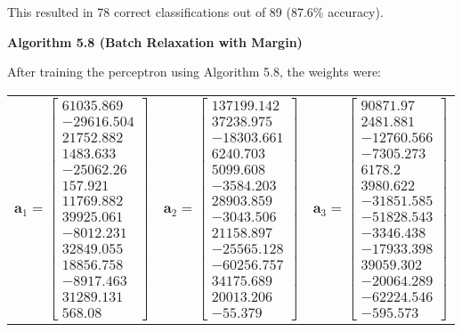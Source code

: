\documentclass{article}
\newcommand{\mbf}[1]{\ensuremath{\mathbf{#1}}}
\newcommand{\fakesection}[1]{{\bf #1}\par}
\begin{document}
This resulted in 78 correct classifications out of 89 (87.6\% accuracy).

\bigskip
\fakesection{Algorithm 5.8 (Batch Relaxation with Margin)}
After training the perceptron using Algorithm 5.8, the weights were:
\begin{center}
\begin{tabular}{ ccc }
$\mbf{a}_1 = \left[\begin{matrix}
61035.869 \\ 
-29616.504 \\ 
21752.882 \\ 
1483.633 \\
-25062.26 \\ 
157.921 \\ 
11769.882 \\ 
39925.061 \\
-8012.231 \\ 
32849.055 \\ 
18856.758 \\ 
-8917.463 \\
31289.131 \\ 
568.08
\end{matrix}\right]$ & 
$\mbf{a}_2 = \left[\begin{matrix}
    137199.142 \\
    37238.975 \\
    -18303.661 \\
    6240.703 \\
    5099.608 \\
    -3584.203 \\
    28903.859 \\
    -3043.506 \\
    21158.897 \\
    -25565.128 \\
    -60256.757 \\
    34175.689 \\
    20013.206 \\
    -55.379 
\end{matrix}\right]$ & 
$\mbf{a}_3 = \left[\begin{matrix}
    90871.97 \\
    2481.881 \\
    -12760.566 \\
    -7305.273 \\
    6178.2 \\
    3980.622 \\
    -31851.585 \\
    -51828.543 \\
    -3346.438 \\
    -17933.398 \\
    39059.302 \\
    -20064.289 \\
    -62224.546 \\
    -595.573
\end{matrix}\right]$
\end{tabular}
\end{center}
\end{document}
